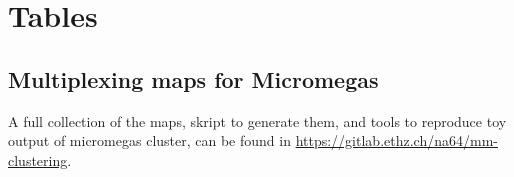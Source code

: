 
\chapter{Tables} %

\label{AppendixF} %

\section{Multiplexing maps for Micromegas}
\label{sec:multiplex-maps}

A full collection of the maps, skript to generate them, and tools to reproduce toy output of micromegas cluster, can be found in \url{https://gitlab.ethz.ch/na64/mm-clustering}.

